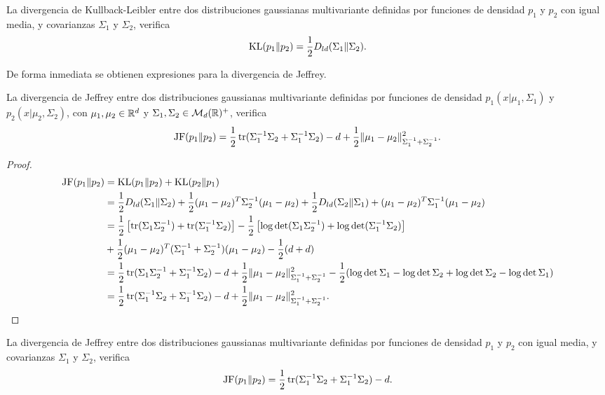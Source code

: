 \begin{cor} \label{prop:caract_kl:2}
    La divergencia de Kullback-Leibler entre dos distribuciones gaussianas multivariante definidas por funciones de densidad $p_1$ y $p_2$ con igual media, y covarianzas $\Sigma_1$ y $\Sigma_2$, verifica
    \[  \operatorname{KL}(p_1\|p_2) = \frac{1}{2}D_{ld}(\Sigma_1\|\Sigma_2). \]
\end{cor}
De forma inmediata se obtienen expresiones para la divergencia de Jeffrey.
\begin{cor} \label{prop:caract_jeffrey:1}
    La divergencia de Jeffrey entre dos distribuciones gaussianas multivariante definidas por funciones de densidad $p_1(x|\mu_1,\Sigma_1)$ y $p_2(x|\mu_2,\Sigma_2)$, con $\mu_1,\mu_2 \in \mathbb{R}^d$ y $\Sigma_1,\Sigma_2 \in \mathcal{M}_d(\mathbb{R})^+$, verifica
    \[  \operatorname{JF}(p_1\|p_2) = \frac{1}{2}\operatorname{tr}(\Sigma_1^{-1}\Sigma_2+\Sigma_1^{-1}\Sigma_2) -d + \frac{1}{2}\|\mu_1-\mu_2\|_{\Sigma_1^{-1}+\Sigma_2^{-1}}^2. \]
\end{cor}
\begin{proof}
    \begin{equation*}
        \begin{split}
        \operatorname{JF}(p_1\|p_2) &= \operatorname{KL}(p_1\|p_2) + \operatorname{KL}(p_2\|p_1) \\
                    &= \frac{1}{2}D_{ld}(\Sigma_1\|\Sigma_2) + \frac{1}{2}(\mu_1-\mu_2)^T\Sigma_2^{-1}(\mu_1-\mu_2) + \frac{1}{2}D_{ld}(\Sigma_2\|\Sigma_1) + (\mu_1-\mu_2)^T\Sigma_1^{-1}(\mu_1-\mu_2) \\
                    &= \frac{1}{2}\left[\operatorname{tr}(\Sigma_1\Sigma_2^{-1})+\operatorname{tr}(\Sigma_1^{-1}\Sigma_2)\right] - \frac{1}{2}\left[\log\det(\Sigma_1\Sigma_2^{-1})+\log\det(\Sigma_1^{-1}\Sigma_2)\right]\\&+\frac{1}{2}(\mu_1-\mu_2)^T(\Sigma_1^{-1}+\Sigma_2^{-1})(\mu_1-\mu_2) - \frac{1}{2}(d+d) \\
                    &= \frac{1}{2} \operatorname{tr}(\Sigma_1\Sigma_2^{-1}+\Sigma_1^{-1}\Sigma_2) -d + \frac{1}{2}\|\mu_1-\mu_2\|_{\Sigma_1^{-1}+\Sigma_2^{-1}}^2 - \frac{1}{2}(\log\det\Sigma_1-\log\det\Sigma_2+\log\det\Sigma_2-\log\det\Sigma_1) \\
                    &= \frac{1}{2}\operatorname{tr}(\Sigma_1^{-1}\Sigma_2+\Sigma_1^{-1}\Sigma_2) -d + \frac{1}{2}\|\mu_1-\mu_2\|_{\Sigma_1^{-1}+\Sigma_2^{-1}}^2.
        \end{split}
    \end{equation*}
\end{proof}
\begin{cor} \label{prop:caract_jeffrey:2}
    La divergencia de Jeffrey entre dos distribuciones gaussianas multivariante definidas por funciones de densidad $p_1$ y $p_2$ con igual media, y covarianzas $\Sigma_1$ y $\Sigma_2$, verifica
    \[  \operatorname{JF}(p_1\|p_2) = \frac{1}{2}\operatorname{tr}(\Sigma_1^{-1}\Sigma_2+\Sigma_1^{-1}\Sigma_2) -d. \]
\end{cor}